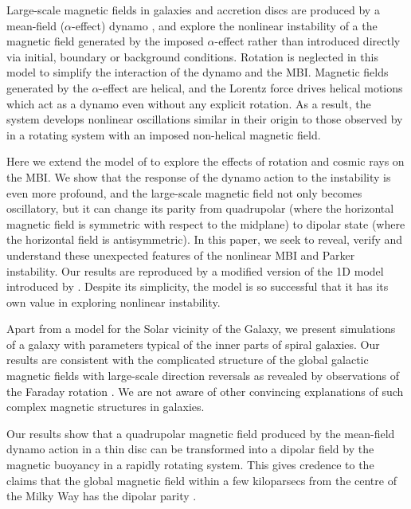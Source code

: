 \documentclass[fleqn,usenatbib]{mnras}
\begin{document}
Large-scale magnetic fields in galaxies and accretion discs are produced by a
mean-field ($\alpha$-effect) dynamo \citep[][and references therein]{SS21}, and
\cite{QSTGB23} explore the nonlinear instability of a the magnetic field
generated by the imposed $\alpha$-effect rather than introduced directly via
initial, boundary or background conditions. Rotation is neglected in this model
to simplify the interaction of the dynamo and the MBI. Magnetic fields
generated by the $\alpha$-effect are helical, and the Lorentz force drives
helical motions which act as a dynamo even without any explicit rotation. As a
result, the system develops nonlinear oscillations similar in their origin to
those observed by \citet{DT2022b} in a rotating system with an imposed
non-helical magnetic field.

Here we extend the model of \citet{QSTGB23} to explore the effects of rotation
and cosmic rays on the MBI. We show that the response of the dynamo action to
the instability is even more profound, and the large-scale magnetic field not
only becomes oscillatory, but it can change its parity from quadrupolar (where
the horizontal magnetic field is symmetric with respect to the midplane) to
dipolar state (where the horizontal field is antisymmetric). In this paper, we
seek to reveal, verify and understand these unexpected features of the
nonlinear MBI and Parker instability.  Our results are reproduced by a modified
version of the {1D} model introduced by \citet{QSTGB23}. Despite its
simplicity, the model is so successful that it has its own value in exploring
nonlinear instability.

Apart from a model for the Solar vicinity of the Galaxy, we present simulations
of a galaxy with parameters typical of the inner parts of spiral galaxies. Our
results are consistent with the complicated structure of the global galactic
magnetic fields with large-scale direction reversals as revealed by
observations of the Faraday rotation \citep[see section~3.4.3 of][for a
review]{IB+24}. We are not aware of other convincing explanations of such
complex magnetic structures in galaxies.

Our results show that a quadrupolar magnetic field produced by the mean-field
dynamo action in a thin disc \citep{SS21} can be transformed into a dipolar
field by the magnetic buoyancy in a rapidly rotating system. This gives
credence to the claims that the global magnetic field within a few kiloparsecs
from the centre of the Milky Way has the dipolar parity \citep{Han17}.
\end{document}
